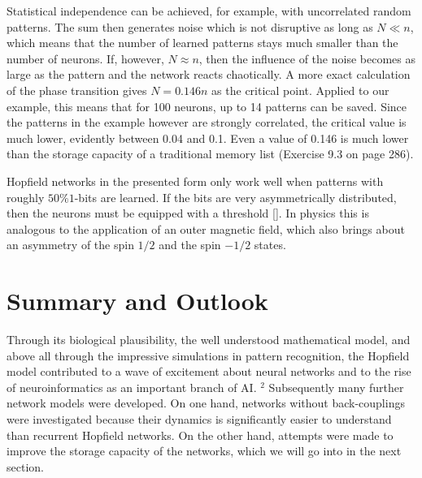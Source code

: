 \documentclass[10pt]{book}
\begin{document}
Statistical independence can be achieved, for example, with uncorrelated random patterns. The sum then generates noise which is not disruptive as long as $N \ll n$, which means that the number of learned patterns stays much smaller than the number of neurons. If, however, $N \approx n$, then the influence of the noise becomes as large as the pattern and the network reacts chaotically. A more exact calculation of the phase transition gives $N=0.146 n$ as the critical point. Applied to our example, this means that for 100 neurons, up to 14 patterns can be saved. Since the patterns in the example however are strongly correlated, the critical value is much lower, evidently between 0.04 and 0.1. Even a value of 0.146 is much lower than the storage capacity of a traditional memory list (Exercise 9.3 on page 286).

Hopfield networks in the presented form only work well when patterns with roughly $50 \% 1$-bits are learned. If the bits are very asymmetrically distributed, then the neurons must be equipped with a threshold [\cite{rojas1996neural}]. In physics this is analogous to the application of an outer magnetic field, which also brings about an asymmetry of the spin $1 / 2$ and the spin $-1 / 2$ states.

\section{Summary and Outlook}
Through its biological plausibility, the well understood mathematical model, and above all through the impressive simulations in pattern recognition, the Hopfield model contributed to a wave of excitement about neural networks and to the rise of neuroinformatics as an important branch of AI. ${ }^{2}$ Subsequently many further network models were developed. On one hand, networks without back-couplings were investigated because their dynamics is significantly easier to understand than recurrent Hopfield networks. On the other hand, attempts were made to improve the storage capacity of the networks, which we will go into in the next section.
\end{document}
